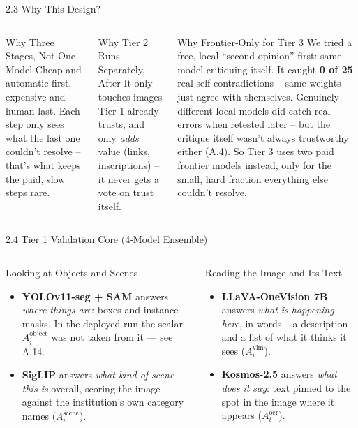 \documentclass[aspectratio=169,11pt]{beamer}
\begin{document}
\begin{frame}{2.3 Why This Design?}
\footnotesize
\begin{columns}[T]
\begin{block}{Why Three Stages, Not One Model}
Cheap and automatic first, expensive and human last. Each step only sees what the last one couldn't resolve -- that's what keeps the paid, slow steps rare.
\end{block}
\begin{block}{Why Tier 2 Runs Separately, After}
It only touches images Tier 1 already trusts, and only \emph{adds} value (links, inscriptions) -- it never gets a vote on trust itself.
\end{block}

\begin{block}{Why Frontier-Only for Tier 3}
We tried a free, local ``second opinion'' first: same model critiquing itself. It caught \textbf{0 of 25} real self-contradictions -- same weights just agree with themselves. Genuinely different local models did catch real errors when retested later -- but the critique itself wasn't always trustworthy either (A.4). So Tier 3 uses two paid frontier models instead, only for the small, hard fraction everything else couldn't resolve.
\end{block}
\end{columns}
\end{frame}

\begin{frame}{2.4 Tier 1 Validation Core (4-Model Ensemble)}
\footnotesize
\begin{columns}[T]
\begin{block}{Looking at Objects and Scenes}
\begin{itemize}
  \item \textbf{YOLOv11-seg + SAM} answers \emph{where things are}: boxes and instance masks. In the deployed run the scalar $A_i^{\text{object}}$ was not taken from it --- see A.14.
  \item \textbf{SigLIP} answers \emph{what kind of scene this is} overall, scoring the image against the institution's own category names ($A_i^{\text{scene}}$).
\end{itemize}
\end{block}

\begin{block}{Reading the Image and Its Text}
\begin{itemize}
  \item \textbf{LLaVA-OneVision 7B} answers \emph{what is happening here}, in words -- a description and a list of what it thinks it sees ($A_i^{\text{vlm}}$).
  \item \textbf{Kosmos-2.5} answers \emph{what does it say}: text pinned to the spot in the image where it appears ($A_i^{\text{ocr}}$).
\end{itemize}
\end{block}
\end{columns}
\end{frame}
\end{document}
